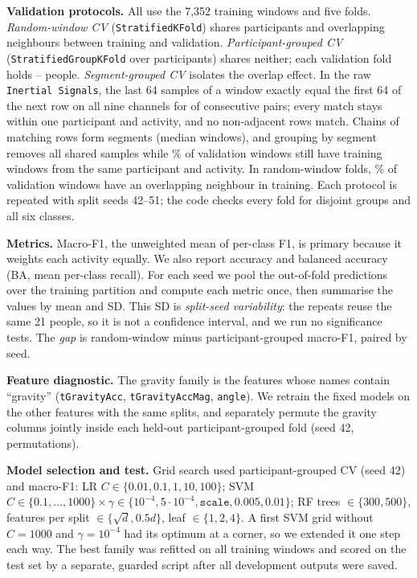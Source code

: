 \documentclass{article}
\begin{document}
\textbf{Validation protocols.} All use the 7,352 training windows and five folds. \emph{Random-window CV} (\texttt{StratifiedKFold}) shares participants and overlapping neighbours between training and validation. \emph{Participant-grouped CV} (\texttt{StratifiedGroupKFold} over participants) shares neither; each validation fold holds \Ngrpvalsubjmin--\Ngrpvalsubjmax{} people. \emph{Segment-grouped CV} isolates the overlap effect. In the raw \texttt{Inertial Signals}, the last 64 samples of a window exactly equal the first 64 of the next row on all nine channels for \Nnlinks{} of \Nnpairs{} consecutive pairs; every match stays within one participant and activity, and no non-adjacent rows match. Chains of matching rows form \Nnseg{} segments (median \Nseglenmed{} windows), and grouping by segment removes all shared samples while \NsaS\% of validation windows still have training windows from the same participant and activity. In random-window folds, \NoverlapR\% of validation windows have an overlapping neighbour in training. Each protocol is repeated with split seeds 42--51; the code checks every fold for disjoint groups and all six classes.

\textbf{Metrics.} Macro-F1, the unweighted mean of per-class F1, is primary because it weights each activity equally. We also report accuracy and balanced accuracy (BA, mean per-class recall). For each seed we pool the out-of-fold predictions over the training partition and compute each metric once, then summarise the \Nnseeds{} values by mean and SD. This SD is \emph{split-seed variability}: the repeats reuse the same 21 people, so it is not a confidence interval, and we run no significance tests. The \emph{gap} is random-window minus participant-grouped macro-F1, paired by seed.

\textbf{Feature diagnostic.} The gravity family is the \Nngrav{} features whose names contain ``gravity'' (\texttt{tGravityAcc}, \texttt{tGravityAccMag}, \texttt{angle}). We retrain the fixed models on the other \Nnkeep{} features with the same splits, and separately permute the gravity columns jointly inside each held-out participant-grouped fold (seed 42, \Nnperm{} permutations).

\textbf{Model selection and test.} Grid search used participant-grouped CV (seed 42) and macro-F1: LR $C\in\{0.01,0.1,1,10,100\}$; SVM $C\in\{0.1,\dots,1000\}\times\gamma\in\{10^{-4},5{\cdot}10^{-4},\texttt{scale},0.005,0.01\}$; RF trees $\in\{300,500\}$, features per split $\in\{\sqrt{d},0.5d\}$, leaf $\in\{1,2,4\}$. A first SVM grid without $C{=}1000$ and $\gamma{=}10^{-4}$ had its optimum at a corner, so we extended it one step each way. The best family was refitted on all training windows and scored on the test set by a separate, guarded script after all development outputs were saved.
\end{document}
